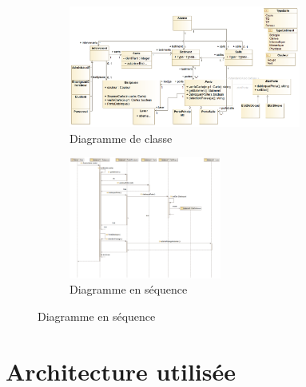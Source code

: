\documentclass[a4paper,10pt]{article}
\begin{document}
    \begin{figure}[h]
        \begin{subfigure}{1.0\textwidth}
            \includegraphics[width=1\linewidth, height=4cm]{image/classe.png}
             \caption{Diagramme de classe}
             \label{fig:classe}
        \end{subfigure}
        \newline
        \newline
        \newline

        \begin{subfigure}{1.0\textwidth}
            \includegraphics[width=1\linewidth, height=4cm]{image/sequence.png}   
            \caption{Diagramme en séquence}
            \label{fig:sequence}
        \end{subfigure}
    \end{figure}

    \pagebreak
    \section{Architecture utilisée}
\end{document}
